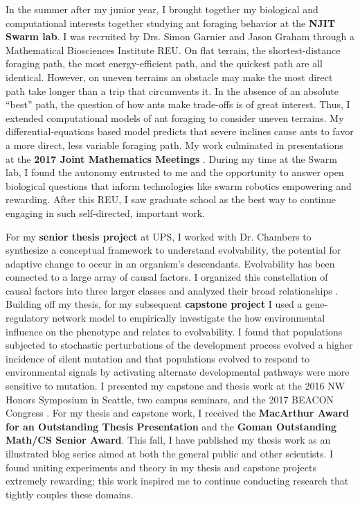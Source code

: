 In the summer after my junior year, I brought together my biological and computational interests together studying ant foraging behavior at the \textbf{NJIT Swarm lab}.
I was recruited by Drs. Simon Garnier and Jason Graham through a Mathematical Biosciences Institute REU.
On flat terrain, the shortest-distance foraging path, the most energy-efficient path, and the quickest path are all identical.
However, on uneven terrains an obstacle may make the most direct path take longer than a trip that circumvents it.
In the absence of an absolute ``best'' path, the question of how ants make trade-offs is of great interest.
Thus, I extended computational models of ant foraging to consider uneven terrains.
My differential-equations based model predicts that severe inclines cause ants to favor a more direct, less variable foraging path.
My work culminated in presentations at the \textbf{2017 Joint Mathematics Meetings} \cite{jmm}.
During my time at the Swarm lab, I found the autonomy entrusted to me and the opportunity to answer open biological questions that inform technologies like swarm robotics empowering and rewarding.
After this REU, I saw graduate school as the best way to continue engaging in such self-directed, important work.

For my \textbf{senior thesis project} at UPS, I worked with Dr. Chambers to synthesize a conceptual framework to understand evolvability, the potential for adaptive change to occur in an organism's descendants.
Evolvability has been connected to a large array of causal factors.
I organized this constellation of causal factors into three larger classes and analyzed their broad relationships \cite{thesis}.
Building off my thesis, for my subsequent \textbf{capstone project} I used a gene-regulatory network model to empirically investigate the how environmental influence on the phenotype and relates to evolvability.
I found that populations subjected to stochastic perturbations of the development process evolved a higher incidence of silent mutation and that populations evolved to respond to environmental signals by activating alternate developmental pathways were more sensitive to mutation.
I presented my capstone and thesis work at the 2016 NW Honors Symposium in Seattle, two campus seminars, and the 2017 BEACON Congress \cite{beacon}.
For my thesis and capstone work, I received the \textbf{MacArthur Award for an Outstanding Thesis Presentation} and the \textbf{Goman Outstanding Math/CS Senior Award}.
This fall, I have published my thesis work as an illustrated blog series aimed at both the general public and other scientists.
I found uniting experiments and theory in my thesis and capstone projects extremely rewarding;
this work inspired me to continue conducting research that tightly couples these domains.
